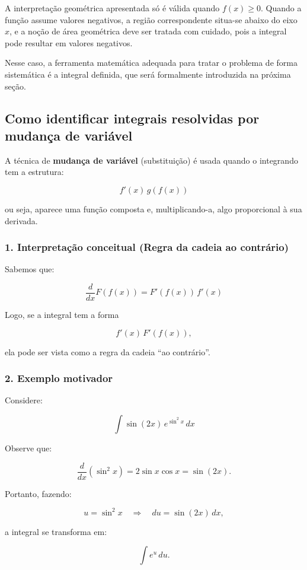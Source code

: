 A interpretação geométrica apresentada só é válida quando $f(x) \ge 0$. Quando a função assume valores negativos, a região correspondente situa-se abaixo do eixo $x$, e a noção de área geométrica deve ser tratada com cuidado, pois a integral pode resultar em valores negativos.

Nesse caso, a ferramenta matemática adequada para tratar o problema de forma sistemática é a integral definida, que será formalmente introduzida na próxima seção.



\subsection*{Como identificar integrais resolvidas por mudança de variável}

A técnica de \textbf{mudança de variável} (substituição) é usada quando o integrando tem a estrutura:

\[
f'(x)\, g(f(x))
\]

ou seja, aparece uma função composta e, multiplicando-a, algo proporcional à sua derivada.

\subsubsection*{1. Interpretação conceitual (Regra da cadeia ao contrário)}

Sabemos que:

\[
\frac{d}{dx} F(f(x)) = F'(f(x))\, f'(x)
\]

Logo, se a integral tem a forma

\[
f'(x)\, F'(f(x)),
\]

ela pode ser vista como a regra da cadeia ``ao contrário''.

\subsubsection*{2. Exemplo motivador}

Considere:

\[
\int \sin(2x)\, e^{\sin^2 x}\, dx
\]

Observe que:

\[
\frac{d}{dx}(\sin^2 x)=2\sin x \cos x=\sin(2x).
\]

Portanto, fazendo:

\[
u=\sin^2 x \quad \Rightarrow \quad du=\sin(2x)\,dx,
\]

a integral se transforma em:

\[
\int e^u\,du.
\]

